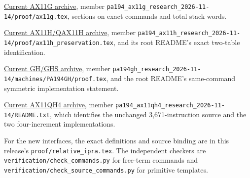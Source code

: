 \begin{description}\raggedright
\item[A]
\href{https://github.com/VladimirReshetnikov/ProveIt/blob/1e1a41f799d4658b829cdd0eabae3775a0c8c4a0/docs/incoming/pa194_ax11g_research_2026-11-14.zip}{Current AX11G archive},
member \nolinkurl{pa194_ax11g_research_2026-11-14/proof/ax11g.tex},
sections on exact commands and total stack words.
\item[H]
\href{https://github.com/VladimirReshetnikov/ProveIt/blob/1e1a41f799d4658b829cdd0eabae3775a0c8c4a0/docs/incoming/pa194_ax11h_research_2026-11-14.zip}{Current AX11H/QAX11H archive},
member \nolinkurl{pa194_ax11h_research_2026-11-14/proof/ax11h_preservation.tex},
and its root README's exact two-table identification.
\item[G]
\href{https://github.com/VladimirReshetnikov/ProveIt/blob/1e1a41f799d4658b829cdd0eabae3775a0c8c4a0/docs/incoming/pa194gh_research_2026-11-14.zip}{Current GH/GHS archive},
member \nolinkurl{pa194gh_research_2026-11-14/machines/PA194GH/proof.tex},
and the root README's same-command symmetric implementation statement.
\item[4]
\href{https://github.com/VladimirReshetnikov/ProveIt/blob/1e1a41f799d4658b829cdd0eabae3775a0c8c4a0/docs/incoming/pa194_ax11qh4_research_2026-11-14.zip}{Current AX11QH4 archive},
member \nolinkurl{pa194_ax11qh4_research_2026-11-14/README.txt},
which identifies the unchanged 3,671-instruction source and the two
four-increment implementations.
\end{description}

\begingroup\raggedright
For the new interfaces, the exact definitions and source binding are
in this release's \nolinkurl{proof/relative_ipra.tex}. The independent
checkers are \nolinkurl{verification/check_commands.py} for free-term
commands and \nolinkurl{verification/check_source_commands.py} for
primitive templates.\par
\endgroup

